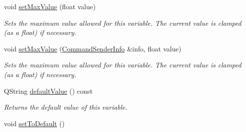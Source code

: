 \begin{DoxyCompactItemize}
void \hyperlink{class_con_var_accd05b21f91b58de63554935dd51df7a}{set\-Max\-Value} (float value)
\begin{DoxyCompactList}\small\item\em Sets the maximum value allowed for this variable. The current value is clamped (as a float) if necessary. \end{DoxyCompactList}\item 
void \hyperlink{class_con_var_a888be5fc32df2ae8c28cbfbe8cdc4cb8}{set\-Max\-Value} (\hyperlink{class_command_sender_info}{Command\-Sender\-Info} \&info, float value)
\begin{DoxyCompactList}\small\item\em Sets the maximum value allowed for this variable. The current value is clamped (as a float) if necessary. \end{DoxyCompactList}\item 
Q\-String \hyperlink{class_con_var_a9b2d1363c0d9455fa35605bd555c1d9e}{default\-Value} () const 
\begin{DoxyCompactList}\small\item\em Returns the default value of this variable. \end{DoxyCompactList}\item 
\hypertarget{class_con_var_a64a961b8a329ae1da039d90e37902b69}{void \hyperlink{class_con_var_a64a961b8a329ae1da039d90e37902b69}{set\-To\-Default} ()}\label{class_con_var_a64a961b8a329ae1da039d90e37902b69}


\end{DoxyCompactItemize}
